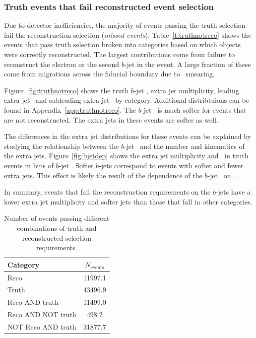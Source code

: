 \subsubsection{Truth events that fail reconstructed event selection}
\label{ss:truthNotReco}
Due to detector inefficiencies, the majority of events passing the truth selection fail the reconstruction selection (\textit{missed events}). Table~\ref{t:truthnotreco} shows the events that pass truth selection broken into categories based on which objects were correctly reconstructed. The largest contributions come from failure to reconstruct the electron or the second $b$-jet in the event. A large fraction of these come from migrations across the fiducial boundary due to \pt\ smearing. 

Figure~\ref{fig:truthnotreco} shows the truth $b$-jet \pt, extra jet multiplicity, leading extra jet \pt\ and subleading extra 
jet \pt\ by category. Additional distribtuions can be found in Appendix~\ref{app:truthnotreco}. The $b$-jet \pt\ 
is much softer for events that are not reconstructed. The extra jets in these events are softer as well.

The differences in the extra jet distributions for these events can be explained by studying the relationship between the $b$-jet \pt\ 
and the number and kinematics of the extra jets. Figure~\ref{fig:bjetdep} shows the extra jet multiplicity and \pt\ in truth events in 
bins of $b$-jet \pt. Softer $b$-jets correspond to events with softer and fewer extra jets. This effect is likely the result of 
the dependence of the  $b$-jet \pt\ on \pttop. 

In summary, events that fail the reconstruction requirements on the $b$-jets have a lower extra jet multiplicity and 
softer jets than those that fall in other categories.   



\begin{table}
\begin{center}
\begin{tabular}{|l|c|}
\hline
Category & $N_{\textrm{events}}$\\
\hline
Reco & 11997.1 \\
Truth & 43496.9 \\
Reco AND truth & 11499.0 \\
Reco AND NOT truth & 498.2 \\
NOT Reco AND truth & 31877.7 \\
\hline
\end{tabular}
\end{center}
\caption{Number of events passing different combinations of truth and reconstructed selection requirements.}
\label{t:truthrecoev}
\end{table}

